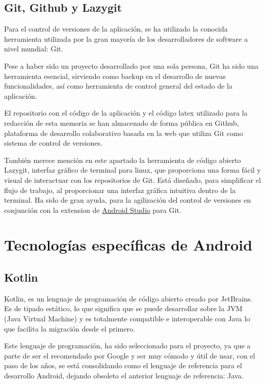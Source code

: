 \subsection{Git, Github y Lazygit}
Para el control de versiones de la aplicación, se ha utilizado la conocida herramienta utilizada por la gran mayoría de los desarrolladores de software a nivel mundial:
Git\hyperlink{cap:biblio}{}. 

Pese a haber sido un proyecto desarrollado por una sola persona, Git ha sido una herramienta esencial, sirviendo como backup en el desarrollo de nuevas funcionalidades, así como herramienta de control general del estado de la aplicación. 

El repositorio con el código de la aplicación y el código latex utilizado para la redacción de esta memoria se han almacenado de forma pública en 
Github\hyperlink{cap:biblio}{}, plataforma de desarrollo colaborativo basada en la web que utiliza Git como sistema de control de versiones.

También merece mención en este apartado la herramienta de código abierto Lazygit\hyperlink{cap:biblio}{}, interfaz gráfico de terminal para linux, que proporciona una forma fácil y visual de interactuar con los repositorios de Git. Está diseñado, para simplificar el flujo de trabajo, al proporcionar una interfaz gráfica intuitiva dentro de la terminal. Ha sido de gran ayuda, para la agilización del control de versiones en conjunción con la extension de \hyperlink{subsec:android_studio}{Android Studio} para Git.
\section{Tecnologías específicas de Android}

\hypertarget{subsec:kotlin}{}
\subsection{Kotlin}
Kotlin\hyperlink{cap:biblio}{}, es un lenguaje de programación de código abierto creado por JetBrains. Es de tipado estático, lo que significa que se puede desarrollar sobre la JVM (Java Virtual Machine) y es totalmente compatible e interoperable con Java lo que facilita la migración desde el primero. 

Este lenguaje de programación, ha sido seleccionado para el proyecto, ya que a parte de ser el recomendado por Google y ser muy cómodo y útil de usar, con el paso de los años, se está consolidando como el lenguaje de referencia para el desarrollo Android, dejando obsoleto el anterior lenguaje de referencia: Java.
